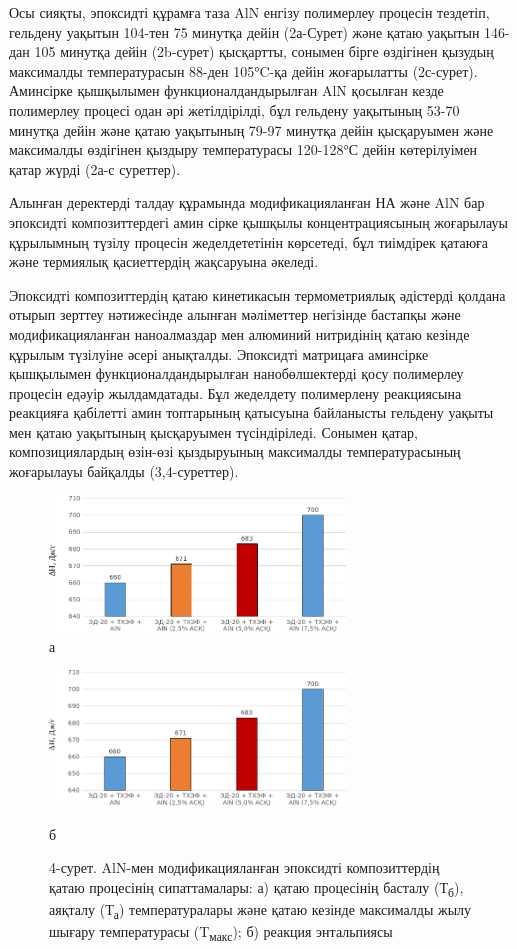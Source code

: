 \begin{multicols}{2}
Осы сияқты, эпоксидті құрамға таза AlN енгізу полимерлеу процесін
тездетіп, гельдену уақытын 104-тен 75 минутқа дейін (2а-Сурет) және
қатаю уақытын 146-дан 105 минутқа дейін (2b-сурет) қысқартты, сонымен
бірге өздігінен қызудың максималды температурасын 88-ден 105°C-қа дейін
жоғарылатты (2с-сурет). Аминсірке қышқылымен функционалдандырылған AlN
қосылған кезде полимерлеу процесі одан әрі жетілдірілді, бұл гельдену
уақытының 53-70 минутқа дейін және қатаю уақытының 79-97 минутқа дейін
қысқаруымен және максималды өздігінен қыздыру температурасы 120-128°С
дейін көтерілуімен қатар жүрді (2а-с суреттер).

Алынған деректерді талдау құрамында модификацияланған НА және AlN бар
эпоксидті композиттердегі амин сірке қышқылы концентрациясының
жоғарылауы құрылымның түзілу процесін жеделдететінін көрсетеді, бұл
тиімдірек қатаюға және термиялық қасиеттердің жақсаруына әкеледі.

Эпоксидті композиттердің қатаю кинетикасын термометриялық әдістерді
қолдана отырып зерттеу нәтижесінде алынған мәліметтер негізінде бастапқы
және модификацияланған наноалмаздар мен алюминий нитридінің қатаю
кезінде құрылым түзілуіне әсері анықталды. Эпоксидті матрицаға аминсірке
қышқылымен функционалдандырылған нанобөлшектерді қосу полимерлеу
процесін едәуір жылдамдатады. Бұл жеделдету полимерлену реакциясына
реакцияға қабілетті амин топтарының қатысуына байланысты гельдену уақыты
мен қатаю уақытының қысқаруымен түсіндіріледі. Сонымен қатар,
композициялардың өзін-өзі қыздыруының максималды температурасының
жоғарылауы байқалды (3,4-суреттер).
\end{multicols}

\begin{figure}[H]
	\centering
	\includegraphics[width=0.7\textwidth]{media/chem/image107}
	\caption*{а}
\end{figure}
\begin{figure}[H]
	\centering
	\includegraphics[width=0.7\textwidth]{media/chem/image108}
    \caption*{б}
    \caption*{4-сурет. AlN-мен модификацияланған эпоксидті композиттердің
қатаю процесінің сипаттамалары: а) қатаю процесінің басталу
(Т\textsubscript{б}), аяқталу (Т\textsubscript{а}) температуралары және
қатаю кезінде максималды жылу шығару температурасы
(T\textsubscript{макс}); б) реакция энтальпиясы}
\end{figure}

